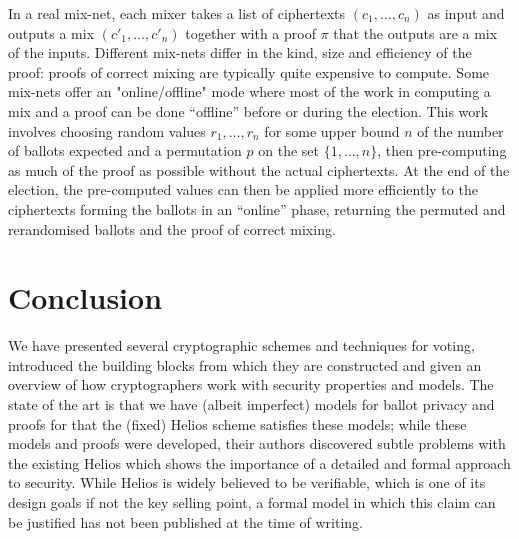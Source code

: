 \documentclass[envcountsame]{llncs}
\begin{document}
In a real mix-net, each mixer takes a list of ciphertexts $(c_1, \ldots, c_n)$
as input and outputs a mix $(c'_1, \ldots, c'_n)$ together with a proof $\pi$
that the outputs are a mix of the inputs. Different mix-nets differ in the kind,
size and efficiency of the proof: proofs of correct mixing are typically
quite expensive to compute. Some mix-nets offer an "online/offline" mode where
most of the work in computing a mix and a proof can be done ``offline'' before
or during the election. This work involves choosing random values $r_1, \ldots,
r_n$ for some upper bound $n$ of the number of ballots expected and a
permutation $p$ on the set $\{1, \ldots, n\}$, then pre-computing as much of the
proof as possible without the actual ciphertexts. At the end of the election,
the pre-computed values can then be applied more efficiently to the ciphertexts
forming the ballots in an ``online'' phase, returning the permuted and
rerandomised ballots and the proof of correct mixing.

\section{Conclusion}

We have presented several cryptographic schemes and techniques for voting,
introduced the building blocks from which they are constructed and given an
overview of how cryptographers work with security properties and models. The
state of the art is that we have (albeit imperfect) models for ballot privacy
and proofs for that the (fixed) Helios scheme satisfies these models; while
these models and proofs were developed, their authors discovered subtle
problems with the existing Helios which shows the importance of a detailed and
formal approach to security. While Helios is widely believed to be verifiable,
which is one of its design goals if not the key selling point, a formal model
in which this claim can be justified has not been published at the time of
writing.
\end{document}
